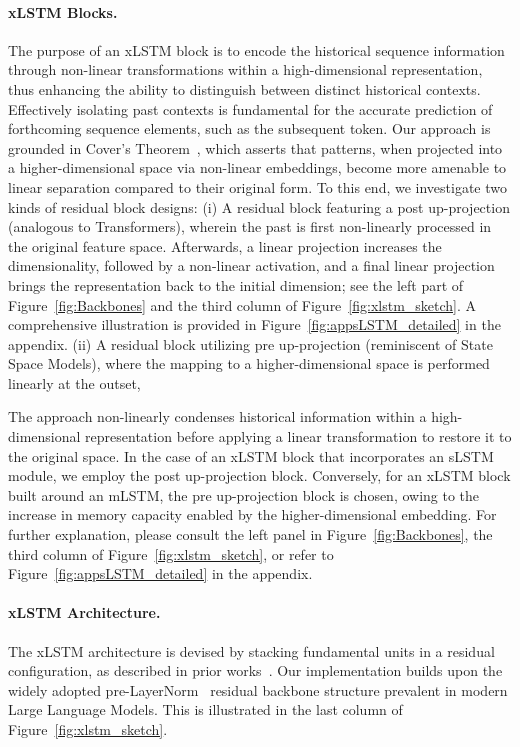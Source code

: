 \paragraph{xLSTM Blocks.}
\label{sec:xLSTMblock}
The purpose of an xLSTM block is to encode the historical sequence information through non-linear transformations within a high-dimensional representation, thus enhancing the ability to distinguish between distinct historical contexts. Effectively isolating past contexts is fundamental for the accurate prediction of forthcoming sequence elements, such as the subsequent token. Our approach is grounded in Cover’s Theorem~\citep{Cover:65}, which asserts that patterns, when projected into a higher-dimensional space via non-linear embeddings, become more amenable to linear separation compared to their original form. To this end, we investigate two kinds of residual block designs: (i) A residual block featuring a post up-projection (analogous to Transformers), wherein the past is first non-linearly processed in the original feature space. Afterwards, a linear projection increases the dimensionality, followed by a non-linear activation, and a final linear projection brings the representation back to the initial dimension; see the left part of Figure~\ref{fig:Backbones}
and the third column of Figure~\ref{fig:xlstm_sketch}. 
A comprehensive illustration is provided in Figure~\ref{fig:appsLSTM_detailed}
in the appendix. (ii) A residual block utilizing pre up-projection (reminiscent of State Space Models), where the mapping to a higher-dimensional space is performed linearly at the outset,

The approach non-linearly condenses historical information within a high-dimensional representation before applying a linear transformation to restore it to the original space. In the case of an xLSTM block that incorporates an sLSTM module, we employ the post up-projection block. Conversely, for an xLSTM block built around an mLSTM, the pre up-projection block is chosen, owing to the increase in memory capacity enabled by the higher-dimensional embedding. For further explanation, please consult the left panel in Figure~\ref{fig:Backbones}, the third column of Figure~\ref{fig:xlstm_sketch}, or refer to Figure~\ref{fig:appsLSTM_detailed} in the appendix.

\paragraph{xLSTM Architecture. }
\label{sec:xLSTMarchitecure}
The xLSTM architecture is devised by stacking fundamental units in a residual configuration, as described in prior works~\citep{Srivastava:15,He:16}. Our implementation builds upon the widely adopted pre-LayerNorm~\citep{Ba:16b} residual backbone structure prevalent in modern Large Language Models. This is illustrated in the last column of Figure~\ref{fig:xlstm_sketch}.

